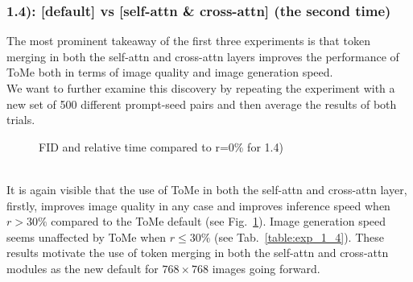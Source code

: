 \subsubsection*{1.4): [default] vs [self-attn \& cross-attn] (the second time)}
The most prominent takeaway of the first three experiments is that token merging in both the self-attn and cross-attn layers improves the performance of ToMe both in terms of image quality and image generation speed.\\
We want to further examine this discovery by repeating the experiment with a new set of 500 different prompt-seed pairs and then average the results of both trials.
\begin{figure}[!htb]
    
    
\caption{FID and relative time compared to r=0\% for 1.4)}
\label{fig:exp_1_4}
\end{figure}\\
It is again visible that the use of ToMe in both the self-attn and cross-attn layer, firstly, improves image quality in any case and improves inference speed when \(r > 30\%\) compared to the ToMe default (see Fig.~\ref{fig:exp_1_4}). Image generation speed seems unaffected by ToMe when \(r \leq 30\%\) (see Tab.~\ref{table:exp_1_4}).
These results motivate the use of token merging in both the self-attn and cross-attn modules as the new default for $768 \times 768$ images going forward.



